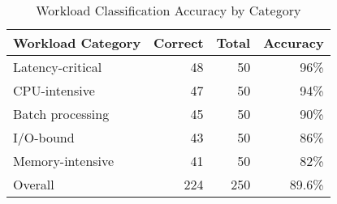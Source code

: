 \begin{table}[h]
\caption{Workload Classification Accuracy by Category}
\label{tab:workload-classification}
\begin{tabular}{lrrr}
\toprule
Workload Category & Correct & Total & Accuracy \\
\midrule
Latency-critical & 48 & 50 & 96\% \\
CPU-intensive & 47 & 50 & 94\% \\
Batch processing & 45 & 50 & 90\% \\
I/O-bound & 43 & 50 & 86\% \\
Memory-intensive & 41 & 50 & 82\% \\
\midrule
Overall & 224 & 250 & 89.6\% \\
\bottomrule
\end{tabular}
\end{table}

